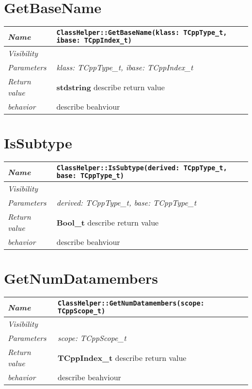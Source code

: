 \section{GetBaseName}
\begin{longtable}{p{3cm} @{\hskip 1cm} p{12cm}}
\hline
\textit{Name} & \texttt{ClassHelper::GetBaseName(klass: TCppType_t, ibase: TCppIndex_t)}\\
\hline
\textit{Visibility} & \\
\hline
\textit{Parameters} & \textit{klass: TCppType_t, ibase: TCppIndex_t}\\
\hline
\textit{Return value} & \textbf{ stdstring} describe return value\\
 \hline
\textit{behavior} & describe beahviour \\
\hline
\end{longtable} \pagebreak
\section{IsSubtype}
\begin{longtable}{p{3cm} @{\hskip 1cm} p{12cm}}
\hline
\textit{Name} & \texttt{ClassHelper::IsSubtype(derived: TCppType_t, base: TCppType_t)}\\
\hline
\textit{Visibility} & \\
\hline
\textit{Parameters} & \textit{derived: TCppType_t, base: TCppType_t}\\
\hline
\textit{Return value} & \textbf{ Bool_t} describe return value\\
 \hline
\textit{behavior} & describe beahviour \\
\hline
\end{longtable} \pagebreak
\section{GetNumDatamembers}
\begin{longtable}{p{3cm} @{\hskip 1cm} p{12cm}}
\hline
\textit{Name} & \texttt{ClassHelper::GetNumDatamembers(scope: TCppScope_t)}\\
\hline
\textit{Visibility} & \\
\hline
\textit{Parameters} & \textit{scope: TCppScope_t}\\
\hline
\textit{Return value} & \textbf{ TCppIndex_t} describe return value\\
 \hline
\textit{behavior} & describe beahviour \\
\hline
\end{longtable} \pagebreak
